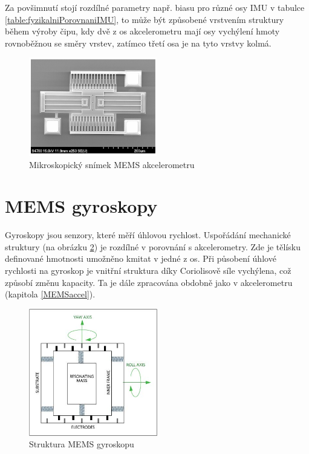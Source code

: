 Za povšimnutí stojí rozdílné parametry např. biasu pro různé osy \ac{IMU} v tabulce \ref{table:fyzikalniPorovnaniIMU}, to může být způsobené vrstvením struktury během výroby čipu, kdy dvě z os akcelerometru mají osy vychýlení hmoty rovnoběžnou se směry vrstev, zatímco třetí osa je na tyto vrstvy kolmá.

\begin{figure}[h]
    \centering
    \includegraphics[width=0.5\textwidth]{obrazky/MEMSaccelerometerPhoto}
    \caption{Mikroskopický snímek MEMS akcelerometru \cite{cCumN04KaPNjERaF}}
    \label{fig:MEMSaccelerometerPhoto}
\end{figure}

\section{MEMS gyroskopy}
Gyroskopy jsou senzory, které měří úhlovou rychlost. Uspořádání mechanické struktury (na obrázku \ref{fig:MEMSgyroscope}) je rozdílné v porovnání s akcelerometry. Zde je tělísku definované hmotnosti umožněno kmitat v jedné z os. Při působení úhlové rychlosti na gyroskop je vnitřní struktura díky Coriolisově síle vychýlena, což způsobí změnu kapacity. Ta je dále zpracována obdobně jako v akcelerometru (kapitola \ref{MEMSaccel}). \cite{Tittertonc2004} \cite{Dadafshar2014}
\begin{figure}[h]
    \centering
    \includegraphics[width=0.5\textwidth]{obrazky/MEMSgyroscope}
    \caption{Struktura MEMS gyroskopu \cite{Dadafshar2014}}
    \label{fig:MEMSgyroscope}
\end{figure}
